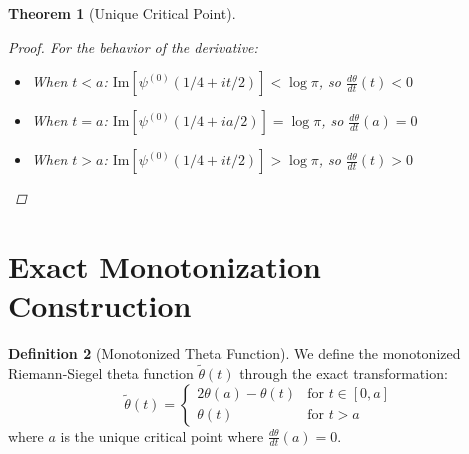 \documentclass{article}
\newtheorem{theorem}{Theorem}
\theoremstyle{definition}
\newtheorem{definition}[theorem]{Definition}
\begin{document}
\begin{theorem}[Unique Critical Point]
\begin{proof}
For the behavior of the derivative:
\begin{itemize}
    \item When $t < a$: $\text{Im}[\psi^{(0)}(1/4 + it/2)] < \log\pi$, so $\frac{d\theta}{dt}(t) < 0$
    \item When $t = a$: $\text{Im}[\psi^{(0)}(1/4 + ia/2)] = \log\pi$, so $\frac{d\theta}{dt}(a) = 0$
    \item When $t > a$: $\text{Im}[\psi^{(0)}(1/4 + it/2)] > \log\pi$, so $\frac{d\theta}{dt}(t) > 0$
\end{itemize}
\end{proof}
\end{theorem}

\section{Exact Monotonization Construction}

\begin{definition}[Monotonized Theta Function]
We define the monotonized Riemann-Siegel theta function $\tilde{\theta}(t)$ through the exact transformation:
\begin{equation}
\tilde{\theta}(t) = 
\begin{cases}
2\theta(a) - \theta(t) & \text{for } t \in [0,a] \\
\theta(t) & \text{for } t > a
\end{cases}
\end{equation}
where $a$ is the unique critical point where $\frac{d\theta}{dt}(a) = 0$.
\end{definition}
\end{document}

